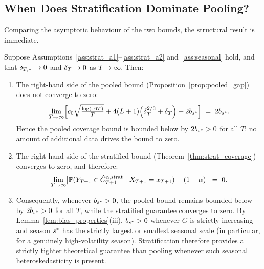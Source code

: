 \subsection{When Does Stratification Dominate Pooling?}
\label{sec:theory:dominance}

Comparing the asymptotic behaviour of the two bounds, the
structural result is immediate.

\begin{proposition}
\label{prop:strat_dominance}
Suppose Assumptions~\ref{ass:strat_a1}--\ref{ass:strat_a2}
and~\ref{ass:seasonal} hold, and that $\delta_{T_{s^*}} \to 0$ and
$\delta_T \to 0$ as $T \to \infty$.  Then:
\begin{enumerate}
  \item[\textup{(i)}]
    The right-hand side of the pooled bound
    (Proposition~\ref{prop:pooled_gap}) does not converge to zero:
    \[
      \lim_{T \to \infty}
      \Bigl[
        c_0\sqrt{\tfrac{\log(16T)}{T}}
        + 4(L+1)\!\left(\delta_T^{2/3}+\delta_T\right)
        + 2b_{s^*}
      \Bigr]
      \;=\; 2b_{s^*}.
    \]
    Hence the pooled coverage bound is bounded below by
    $2b_{s^*} > 0$ for all $T$: no amount of
    additional data drives the bound to zero.

  \item[\textup{(ii)}]
    The right-hand side of the stratified bound
    (Theorem~\ref{thm:strat_coverage}) converges to zero, and
    therefore:
    \[
      \lim_{T \to \infty}
      \bigl|
        \mathbb{P}(Y_{T+1} \in \hat{C}_{T+1}^{\alpha,\textup{strat}}
              \mid X_{T+1} = x_{T+1})
        - (1-\alpha)
      \bigr|
      \;=\; 0.
    \]

  \item[\textup{(iii)}]
    Consequently, whenever $b_{s^*} > 0$, the pooled bound
    remains bounded below by
    $2b_{s^*} > 0$ for all $T$, while the stratified guarantee
    converges to zero.  By Lemma~\ref{lem:bias_properties}(iii),
    $b_{s^*} > 0$ whenever $G$ is strictly increasing and season
    $s^*$ has the strictly largest or smallest seasonal scale
    (in particular, for a genuinely high-volatility season).
    Stratification therefore provides a strictly tighter theoretical
    guarantee than pooling whenever such seasonal heteroskedasticity
    is present.
\end{enumerate}
\end{proposition}

